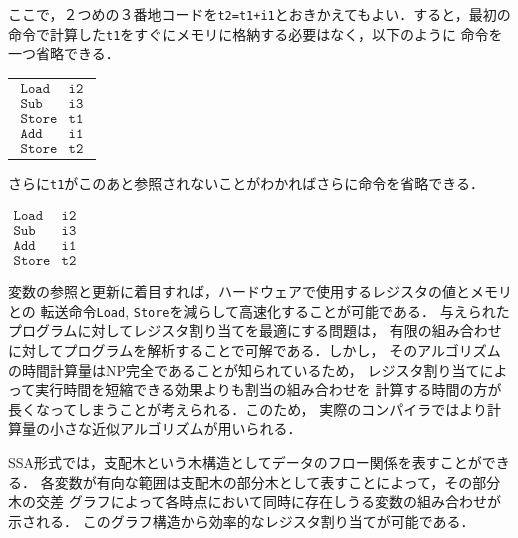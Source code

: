 \documentclass[a4j,dvipdfmx]{jbook}
\begin{document}
ここで，２つめの３番地コードを\verb|t2=t1+i1|とおきかえてもよい．すると，最初の
命令で計算した\verb|t1|をすぐにメモリに格納する必要はなく，以下のように
命令を一つ省略できる．

\begin{center}
  \begin{tabular}{l}
    $\begin{array}{ll}
         \texttt{Load}  & \texttt{i2} \\
         \texttt{Sub}   & \texttt{i3} \\
         \texttt{Store} & \texttt{t1} \\
         \texttt{Add}   & \texttt{i1} \\
         \texttt{Store} & \texttt{t2}
       \end{array}$ \\
  \end{tabular}
\end{center}

さらに\verb|t1|がこのあと参照されないことがわかればさらに命令を省略できる．

\begin{center}
  $\begin{array}{ll}
      \texttt{Load}  & \texttt{i2} \\
      \texttt{Sub}   & \texttt{i3} \\
      \texttt{Add}   & \texttt{i1} \\
      \texttt{Store} & \texttt{t2}
    \end{array}$
\end{center}

変数の参照と更新に着目すれば，ハードウェアで使用するレジスタの値とメモリとの
転送命令\verb|Load|, \verb|Store|を減らして高速化することが可能である．
与えられたプログラムに対してレジスタ割り当てを最適にする問題は，
有限の組み合わせに対してプログラムを解析することで可解である．しかし，
そのアルゴリズムの時間計算量はNP完全であることが知られているため，
レジスタ割り当てによって実行時間を短縮できる効果よりも割当の組み合わせを
計算する時間の方が長くなってしまうことが考えられる．このため，
実際のコンパイラではより計算量の小さな近似アルゴリズムが用いられる．

SSA形式では，支配木という木構造としてデータのフロー関係を表すことができる．
各変数が有向な範囲は支配木の部分木として表すことによって，その部分木の交差
グラフによって各時点において同時に存在しうる変数の組み合わせが示される．
このグラフ構造から効率的なレジスタ割り当てが可能である．
\end{document}
